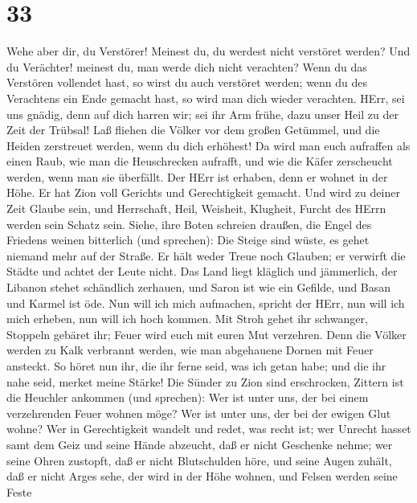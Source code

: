 \hypertarget{section-32}{%
\section{33}\label{section-32}}

 Wehe aber dir, du Verstörer! Meinest du, du werdest nicht
verstöret werden? Und du Verächter! meinest du, man werde dich nicht
verachten? Wenn du das Verstören vollendet hast, so wirst du auch
verstöret werden; wenn du des Verachtens ein Ende gemacht hast, so wird
man dich wieder verachten.  HErr, sei uns gnädig, denn auf
dich harren wir; sei ihr Arm frühe, dazu unser Heil zu der Zeit der
Trübsal!  Laß fliehen die Völker vor dem großen Getümmel,
und die Heiden zerstreuet werden, wenn du dich erhöhest!  Da
wird man euch aufraffen als einen Raub, wie man die Heuschrecken
aufrafft, und wie die Käfer zerscheucht werden, wenn man sie überfällt.
 Der HErr ist erhaben, denn er wohnet in der Höhe. Er hat
Zion voll Gerichts und Gerechtigkeit gemacht.  Und wird zu
deiner Zeit Glaube sein, und Herrschaft, Heil, Weisheit, Klugheit,
Furcht des HErrn werden sein Schatz sein.  Siehe, ihre Boten
schreien draußen, die Engel des Friedens weinen bitterlich (und
sprechen):  Die Steige sind wüste, es gehet niemand mehr auf
der Straße. Er hält weder Treue noch Glauben; er verwirft die Städte und
achtet der Leute nicht.  Das Land liegt kläglich und
jämmerlich, der Libanon stehet schändlich zerhauen, und Saron ist wie
ein Gefilde, und Basan und Karmel ist öde.  Nun will ich
mich aufmachen, spricht der HErr, nun will ich mich erheben, nun will
ich hoch kommen.  Mit Stroh gehet ihr schwanger, Stoppeln
gebäret ihr; Feuer wird euch mit euren Mut verzehren.  Denn
die Völker werden zu Kalk verbrannt werden, wie man abgehauene Dornen
mit Feuer ansteckt.  So höret nun ihr, die ihr ferne seid,
was ich getan habe; und die ihr nahe seid, merket meine Stärke!
 Die Sünder zu Zion sind erschrocken, Zittern ist die
Heuchler ankommen (und sprechen): Wer ist unter uns, der bei einem
verzehrenden Feuer wohnen möge? Wer ist unter uns, der bei der ewigen
Glut wohne?  Wer in Gerechtigkeit wandelt und redet, was
recht ist; wer Unrecht hasset samt dem Geiz und seine Hände abzeucht,
daß er nicht Geschenke nehme; wer seine Ohren zustopft, daß er nicht
Blutschulden höre, und seine Augen zuhält, daß er nicht Arges sehe,
 der wird in der Höhe wohnen, und Felsen werden seine Feste
